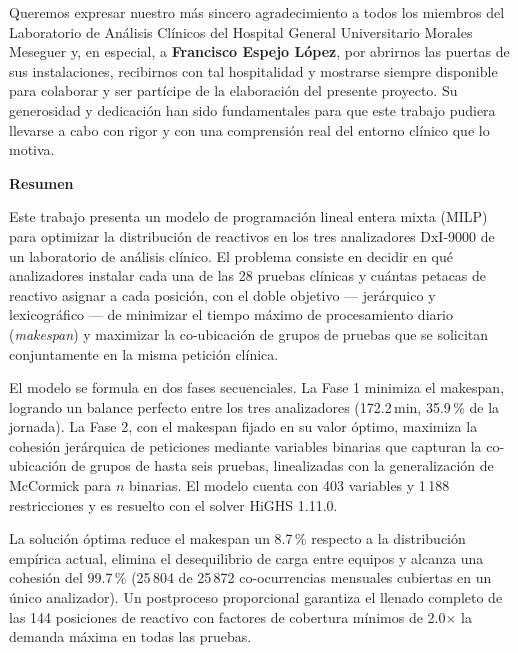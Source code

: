 \documentclass[12pt, a4paper]{article}
\begin{document}
\noindent
Queremos expresar nuestro más sincero agradecimiento a todos los miembros del
Laboratorio de Análisis Clínicos del Hospital General Universitario Morales Meseguer
y, en especial, a \textbf{Francisco Espejo López}, por abrirnos las puertas de sus
instalaciones, recibirnos con tal hospitalidad y mostrarse siempre disponible para
colaborar y ser partícipe de la elaboración del presente proyecto.
Su generosidad y dedicación han sido fundamentales para que este trabajo pudiera
llevarse a cabo con rigor y con una comprensión real del entorno clínico que lo motiva.

\vfill

\clearpage
\thispagestyle{empty}
\vspace*{1.5cm}
{\Large\bfseries Resumen}
\vspace{1em}

\noindent
Este trabajo presenta un modelo de programación lineal entera mixta (MILP) para optimizar
la distribución de reactivos en los tres analizadores DxI-9000 de un laboratorio de
análisis clínico. El problema consiste en decidir en qué analizadores instalar cada una
de las 28 pruebas clínicas y cuántas petacas de reactivo asignar a cada posición, con el
doble objetivo --- jerárquico y lexicográfico --- de minimizar el tiempo máximo de
procesamiento diario (\emph{makespan}) y maximizar la co-ubicación de grupos de pruebas
que se solicitan conjuntamente en la misma petición clínica.

\medskip\noindent
El modelo se formula en dos fases secuenciales. La Fase 1 minimiza el makespan, logrando
un balance perfecto entre los tres analizadores (172.2\,min, 35.9\,\% de la jornada).
La Fase 2, con el makespan fijado en su valor óptimo, maximiza la cohesión jerárquica de
peticiones mediante variables binarias que capturan la co-ubicación de grupos de hasta
seis pruebas, linealizadas con la generalización de McCormick para $n$ binarias. El modelo
cuenta con 403 variables y 1\,188 restricciones y es resuelto con el solver HiGHS 1.11.0.

\medskip\noindent
La solución óptima reduce el makespan un 8.7\,\% respecto a la distribución empírica
actual, elimina el desequilibrio de carga entre equipos y alcanza una cohesión del
99.7\,\% (25\,804 de 25\,872 co-ocurrencias mensuales cubiertas en un único analizador).
Un postproceso proporcional garantiza el llenado completo de las 144 posiciones de
reactivo con factores de cobertura mínimos de 2.0$\times$ la demanda máxima en todas las
pruebas.
\end{document}
